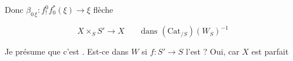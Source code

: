 Donc  $\beta_{0\,\xi}:f_!^0f_0^*(\xi)\longrightarrow\xi$ flèche

\[
 X\times_S S'\longrightarrow X\qquad\text{dans }(\mathrm{Cat}_{/S})(W_S)^{-1}
\]


Je présume que c'est . Est-ce dans $W$ si $f:S'\longrightarrow S$ l'est ? Oui, car $X$ est parfait
